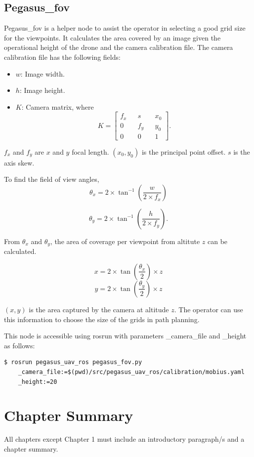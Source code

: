 \subsection{Pegasus\_fov}
Pegasus\_fov is a helper node to assist the operator in selecting a good grid size for the viewpoints. It calculates the area covered by an image given the operational height of the drone and the camera calibration file. The camera calibration file has the following fields:

\begin{itemize}
	\item $w$: Image width.
	\item $h$: Image height.
	\item $K$: Camera matrix, where 
	$$K = \begin{bmatrix}
	f_x && s   && x_0 \\
	0   && f_y && y_0 \\
	0   && 0   && 1
	\end{bmatrix}.$$
\end{itemize}

$f_x$ and $f_y$ are $x$ and $y$ focal length. $(x_0, y_0)$ is the principal point offset. $s$ is the axis skew.

To find the field of view angles,
$$ \theta_x = 2 \times \tan^{-1}(\frac{w}{2 \times f_x}) $$

$$ \theta_y = 2 \times \tan^{-1}(\frac{h}{2 \times f_y}).$$

From $\theta_x$ and $\theta_y$, the area of coverage per viewpoint from altitute $z$ can be calculated.

$$ x = 2 \times \tan(\frac{\theta_x}{2}) \times z $$
$$ y = 2 \times \tan(\frac{\theta_y}{2}) \times z $$ 

$(x, y)$ is the area captured by the camera at altitude $z$. The operator can use this information to choose the size of the grids in path planning.

This node is accessible using rosrun with parameters \_camera\_file and \_height as follows:

\begin{verbatim}
$ rosrun pegasus_uav_ros pegasus_fov.py 
    _camera_file:=$(pwd)/src/pegasus_uav_ros/calibration/mobius.yaml 
    _height:=20
\end{verbatim}

\section{Chapter Summary}
All chapters except Chapter 1 must include an introductory paragraph/s and a chapter summary.

\FloatBarrier